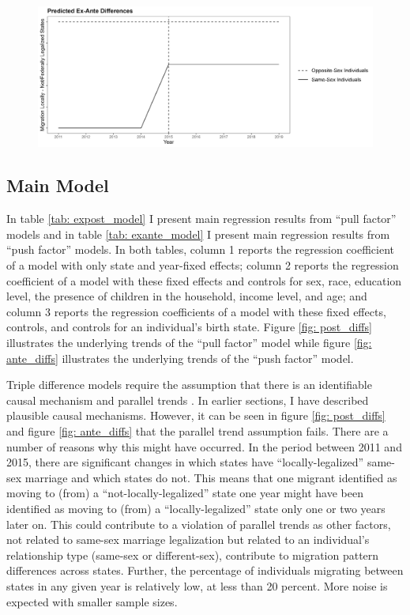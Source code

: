 \documentclass[12pt,letterpaper]{article}
\begin{document}
\begin{figure}[h]
    \centering
    \includegraphics[width=0.75\linewidth]{outputs/summary_stats/ex_ante_diffs.png}
    \caption{}
    \label{fig: ex_ante_diffs}
\end{figure}

\clearpage
\subsection{Main Model} %
In table \ref{tab: expost_model} I present main regression results from “pull factor” models and in table \ref{tab: exante_model} I present main regression results from “push factor” models. In both tables, column 1 reports the regression coefficient of a model with only state and year-fixed effects; column 2 reports the regression coefficient of a model with these fixed effects and controls for sex, race, education level, the presence of children in the household, income level, and age; and column 3 reports the regression coefficients of a model with these fixed effects, controls, and controls for an individual’s birth state. Figure \ref{fig: post_diffs} illustrates the underlying trends of the “pull factor” model while figure \ref{fig: ante_diffs} illustrates the underlying trends of the “push factor” model. 

Triple difference models require the assumption that there is an identifiable causal mechanism and parallel trends \citep{24, 25}. In earlier sections, I have described plausible causal mechanisms. However, it can be seen in figure \ref{fig: post_diffs} and figure \ref{fig: ante_diffs} that the parallel trend assumption fails. There are a number of reasons why this might have occurred. In the period between 2011 and 2015, there are significant changes in which states have “locally-legalized” same-sex marriage and which states do not. This means that one migrant identified as moving to (from) a “not-locally-legalized” state one year might have been identified as moving to (from) a “locally-legalized” state only one or two years later on. This could contribute to a violation of parallel trends as other factors, not related to same-sex marriage legalization but related to an individual's relationship type (same-sex or different-sex), contribute to migration pattern differences across states. Further, the percentage of individuals migrating between states in any given year is relatively low, at less than 20 percent. More noise is expected with smaller sample sizes. 
\end{document}
